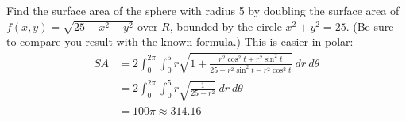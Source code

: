 {Find the surface area of the sphere with radius 5 by doubling the surface area of $f(x,y) = \sqrt{25-x^2-y^2}$ over $R$, bounded by the circle $x^2+y^2=25$. (Be sure to compare you result with the known formula.)
}
{This is easier in polar:
\begin{align*}SA &= 2\int_{0}^{2\pi}\int_{0}^{5} r\sqrt{1+ \frac{r^2\cos^2t+r^2\sin^2t}{25-r^2\sin^2t-r^2\cos^2t}}\ dr\ d\theta\\
		&= 2\int_0^{2\pi}\int_0^5r\sqrt{\frac{1}{25-r^2}}\ dr\ d\theta \\
		&= 100\pi\approx 314.16
\end{align*}
}
